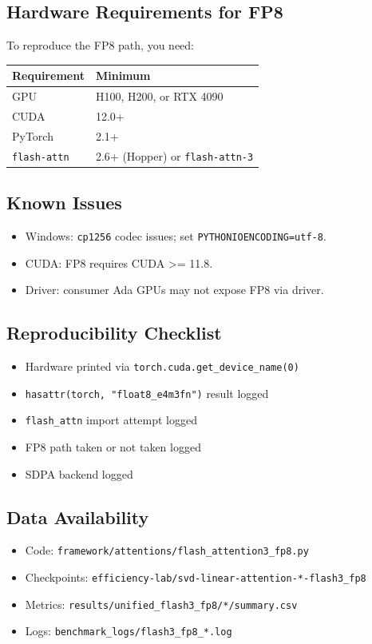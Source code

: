 \subsection{Hardware Requirements for FP8}

To reproduce the FP8 path, you need:

\begin{table}[H]
\centering
\small
\begin{tabular}{ll}
\toprule
\textbf{Requirement} & \textbf{Minimum} \\
\midrule
GPU & H100, H200, or RTX 4090 \\
CUDA & 12.0+ \\
PyTorch & 2.1+ \\
\texttt{flash-attn} & 2.6+ (Hopper) or \texttt{flash-attn-3} \\
\bottomrule
\end{tabular}
\end{table}

\subsection{Known Issues}

\begin{itemize}
\item Windows: \texttt{cp1256} codec issues; set \texttt{PYTHONIOENCODING=utf-8}.
\item CUDA: FP8 requires CUDA \textgreater{}= 11.8.
\item Driver: consumer Ada GPUs may not expose FP8 via driver.

\end{itemize}
\subsection{Reproducibility Checklist}

\begin{itemize}
\item [x] Hardware printed via \texttt{torch.cuda.get\_device\_name(0)}
\item [x] \texttt{hasattr(torch, "float8\_e4m3fn")} result logged
\item [x] \texttt{flash\_attn} import attempt logged
\item [x] FP8 path taken or not taken logged
\item [x] SDPA backend logged

\end{itemize}
\subsection{Data Availability}

\begin{itemize}
\item Code: \texttt{framework/attentions/flash\_attention3\_fp8.py}
\item Checkpoints: \texttt{efficiency-lab/svd-linear-attention-*-flash3\_fp8}
\item Metrics: \texttt{results/unified\_flash3\_fp8/*/summary.csv}
\item Logs: \texttt{benchmark\_logs/flash3\_fp8\_*.log}

\end{itemize}
